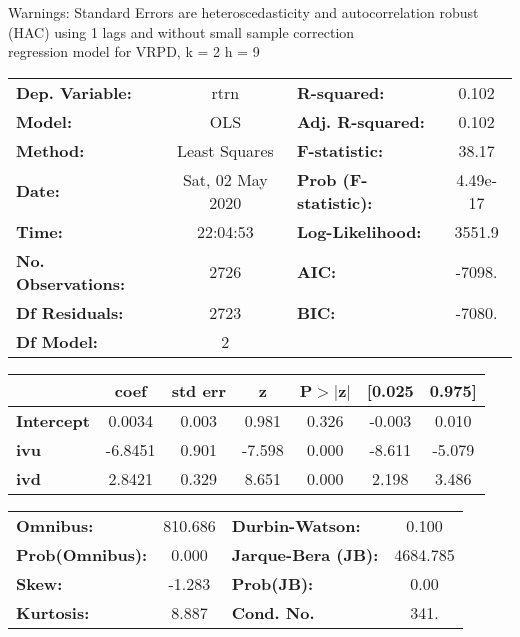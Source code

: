 Warnings: \newline
 [1] Standard Errors are heteroscedasticity and autocorrelation robust (HAC) using 1 lags and without small sample correction\\ 

regression model for VRPD, k = 2 h = 9\begin{center}
\begin{tabular}{lclc}
\toprule
\textbf{Dep. Variable:}    &       rtrn       & \textbf{  R-squared:         } &     0.102   \\
\textbf{Model:}            &       OLS        & \textbf{  Adj. R-squared:    } &     0.102   \\
\textbf{Method:}           &  Least Squares   & \textbf{  F-statistic:       } &     38.17   \\
\textbf{Date:}             & Sat, 02 May 2020 & \textbf{  Prob (F-statistic):} &  4.49e-17   \\
\textbf{Time:}             &     22:04:53     & \textbf{  Log-Likelihood:    } &    3551.9   \\
\textbf{No. Observations:} &        2726      & \textbf{  AIC:               } &    -7098.   \\
\textbf{Df Residuals:}     &        2723      & \textbf{  BIC:               } &    -7080.   \\
\textbf{Df Model:}         &           2      & \textbf{                     } &             \\
\bottomrule
\end{tabular}
\begin{tabular}{lcccccc}
                   & \textbf{coef} & \textbf{std err} & \textbf{z} & \textbf{P$> |$z$|$} & \textbf{[0.025} & \textbf{0.975]}  \\
\midrule
\textbf{Intercept} &       0.0034  &        0.003     &     0.981  &         0.326        &       -0.003    &        0.010     \\
\textbf{ivu}       &      -6.8451  &        0.901     &    -7.598  &         0.000        &       -8.611    &       -5.079     \\
\textbf{ivd}       &       2.8421  &        0.329     &     8.651  &         0.000        &        2.198    &        3.486     \\
\bottomrule
\end{tabular}
\begin{tabular}{lclc}
\textbf{Omnibus:}       & 810.686 & \textbf{  Durbin-Watson:     } &    0.100  \\
\textbf{Prob(Omnibus):} &   0.000 & \textbf{  Jarque-Bera (JB):  } & 4684.785  \\
\textbf{Skew:}          &  -1.283 & \textbf{  Prob(JB):          } &     0.00  \\
\textbf{Kurtosis:}      &   8.887 & \textbf{  Cond. No.          } &     341.  \\
\bottomrule
\end{tabular}
\end{center}

